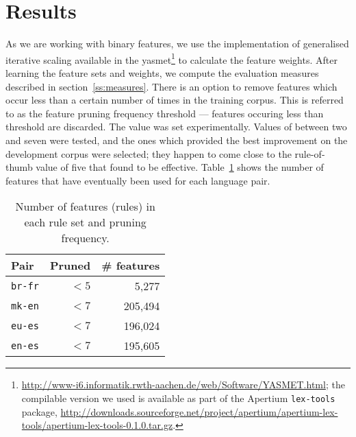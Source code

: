 \documentclass[11pt]{article}
\begin{document}
\section{Results}
\label{sec:eval-ref-results}

As we are working with binary features, we use the implementation of
generalised iterative scaling available in the {\sc
  yasmet}\footnote{\url{http://www-i6.informatik.rwth-aachen.de/web/Software/YASMET.html};
  the compilable version we used is available as part of the Apertium
  \texttt{lex-tools} package,
  \url{http://downloads.sourceforge.net/project/apertium/apertium-lex-tools/apertium-lex-tools-0.1.0.tar.gz}.}
to calculate the feature weights.  After learning the feature sets and
weights, we compute the evaluation measures described in
section~\ref{ss:measures}. There is an option to remove features which
occur less than a certain number of times in the training corpus. This
is referred to as the feature pruning frequency threshold --- features
occuring less than threshold are discarded. The value was set
experimentally. Values of between two and seven were tested, and the
ones which provided the best improvement on the development corpus
were selected; they happen to come close to the rule-of-thumb value of
five that \citet[p.~596]{Manning99b} found to be effective.
Table~\ref{table:maxent-features} shows the number of features that
have eventually been used for each language pair.


\begin{table}
 \begin{center}
    \begin{tabular}{|l|r|r|}
        \hline
        \textbf{Pair} & \textbf{Pruned} & \textbf{\# features} \\
        \hline
        {\tt br-fr}  & $< 5$              & 5,277    \\ 
        \hline
        {\tt mk-en} & $< 7$              & 205,494 \\ 
        \hline
        {\tt eu-es} & $< 7$              & 196,024\\
        \hline
        {\tt en-es} & $< 7$              & 195,605\\
        \hline
    \end{tabular}
 \end{center}
 \caption{Number of features (rules) in each rule set and pruning frequency.}
 \label{table:maxent-features}
\end{table}
\end{document}
